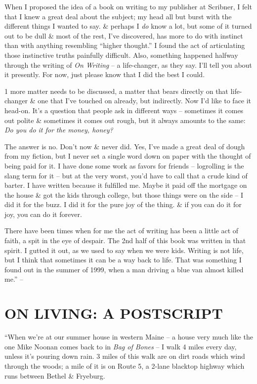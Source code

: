 \documentclass{article}
\numberwithin{equation}{section}
\begin{document}
When I proposed the idea of a book on writing to my publisher at Scribner, I felt that I knew a great deal about the subject; my head all but burst with the different things I wanted to say. \& perhaps I \textit{do} know a lot, but some of it turned out to be dull \& most of the rest, I've discovered, has more to do with instinct than with anything resembling ``higher thought.'' I found the act of articulating those instinctive truths painfully difficult. Also, something happened halfway through the writing of \textit{On Writing} -- a life-changer, as they say. I'll tell you about it presently. For now, just please know that I did the best I could.

1 more matter needs to be discussed, a matter that bears directly on that life-changer \& one that I've touched on already, but indirectly. Now I'd like to face it head-on. It's a question that people ask in different ways -- sometimes it comes out polite \& sometimes it comes out rough, but it always amounts to the same: \textit{Do you do it for the money, honey?}

The answer is no. Don't now \& never did. Yes, I've made a great deal of dough from my fiction, but I never set a single word down on paper with the thought of being paid for it. I have done some work as favors for friends -- logrolling is the slang term for it -- but at the very worst, you'd have to call that a crude kind of barter. I have written because it fulfilled me. Maybe it paid off the mortgage on the house \& got the kids through college, but those things were on the side -- I did it for the buzz. I did it for the pure joy of the thing. \& if you can do it for joy, you can do it forever.

There have been times when for me the act of writing has been a little act of faith, a spit in the eye of despair. The 2nd half of this book was written in that spirit. I gutted it out, as we used to say when we were kids. Writing is not life, but I think that sometimes it can be a way back to life. That was something I found out in the summer of 1999, when a man driving a blue van almost killed me.'' -- \cite[pp. 108--202]{King2010}


\section{ON LIVING: A POSTSCRIPT}
 ``When we're at our summer house in western Maine -- a house very much like the one Mike Noonan comes back to in \textit{Bag of Bones} -- I walk 4 miles every day, unless it's pouring down rain. 3 miles of this walk are on dirt roads which wind through the woods; a mile of it is on Route 5, a 2-lane blacktop highway which runs between Bethel \& Fryeburg.
\end{document}
